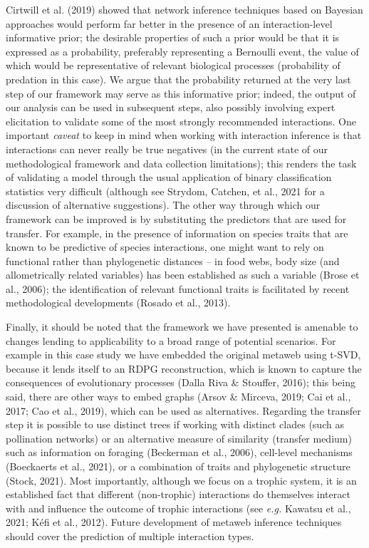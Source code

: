 \documentclass[11pt]{article}
\begin{document}
Cirtwill et al. (2019) showed that network inference techniques based on
Bayesian approaches would perform far better in the presence of an
interaction-level informative prior; the desirable properties of such a
prior would be that it is expressed as a probability, preferably
representing a Bernoulli event, the value of which would be
representative of relevant biological processes (probability of
predation in this case). We argue that the probability returned at the
very last step of our framework may serve as this informative prior;
indeed, the output of our analysis can be used in subsequent steps, also
possibly involving expert elicitation to validate some of the most
strongly recommended interactions. One important \emph{caveat} to keep
in mind when working with interaction inference is that interactions can
never really be true negatives (in the current state of our
methodological framework and data collection limitations); this renders
the task of validating a model through the usual application of binary
classification statistics very difficult (although see Strydom, Catchen,
et al., 2021 for a discussion of alternative suggestions). The other way
through which our framework can be improved is by substituting the
predictors that are used for transfer. For example, in the presence of
information on species traits that are known to be predictive of species
interactions, one might want to rely on functional rather than
phylogenetic distances -- in food webs, body size (and allometrically
related variables) has been established as such a variable (Brose et
al., 2006); the identification of relevant functional traits is
facilitated by recent methodological developments (Rosado et al., 2013).

Finally, it should be noted that the framework we have presented is
amenable to changes lending to applicability to a broad range of
potential scenarios. For example in this case study we have embedded the
original metaweb using t-SVD, because it lends itself to an RDPG
reconstruction, which is known to capture the consequences of
evolutionary processes (Dalla Riva \& Stouffer, 2016); this being said,
there are other ways to embed graphs (Arsov \& Mirceva, 2019; Cai et
al., 2017; Cao et al., 2019), which can be used as alternatives.
Regarding the transfer step it is possible to use distinct trees if
working with distinct clades (such as pollination networks) or an
alternative measure of similarity (transfer medium) such as information
on foraging (Beckerman et al., 2006), cell-level mechanisms (Boeckaerts
et al., 2021), or a combination of traits and phylogenetic structure
(Stock, 2021). Most importantly, although we focus on a trophic system,
it is an established fact that different (non-trophic) interactions do
themselves interact with and influence the outcome of trophic
interactions (see \emph{e.g.} Kawatsu et al., 2021; Kéfi et al., 2012).
Future development of metaweb inference techniques should cover the
prediction of multiple interaction types.
\end{document}
